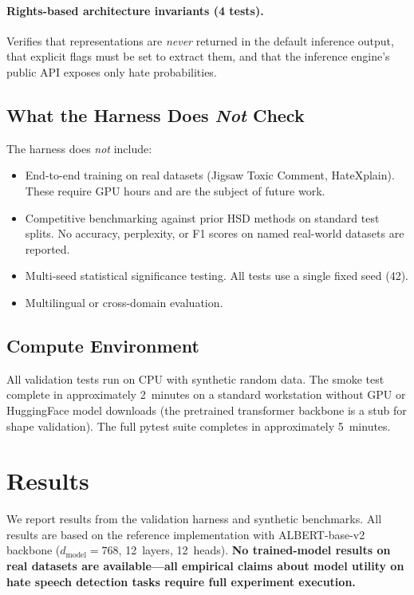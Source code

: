 \documentclass{article}
\begin{document}
\paragraph{Rights-based architecture invariants (4 tests).}
Verifies that representations are \emph{never} returned in the default
inference output, that explicit flags must be set to extract them, and
that the inference engine's public API exposes only hate probabilities.

\subsection{What the Harness Does \emph{Not} Check}

The harness does \emph{not} include:
\begin{itemize}
  \item End-to-end training on real datasets (Jigsaw Toxic Comment,
        HateXplain). These require GPU hours and are the subject of
        future work.
  \item Competitive benchmarking against prior HSD methods on standard
        test splits. No accuracy, perplexity, or F1 scores on named
        real-world datasets are reported.
  \item Multi-seed statistical significance testing. All tests use a
        single fixed seed (42).
  \item Multilingual or cross-domain evaluation.
\end{itemize}

\subsection{Compute Environment}

All validation tests run on CPU with synthetic random data.
The smoke test complete in approximately 2~minutes on a standard
workstation without GPU or HuggingFace model downloads (the
pretrained transformer backbone is a stub for shape validation).
The full pytest suite completes in approximately 5~minutes.


\section{Results}
\label{sec:results}

We report results from the validation harness and synthetic benchmarks.
All results are based on the reference implementation with
ALBERT-base-v2 backbone ($d_{\text{model}}=768$, 12~layers, 12~heads).
\textbf{No trained-model results on real datasets are available---all
empirical claims about model utility on hate speech detection tasks
require full experiment execution.}
\end{document}
